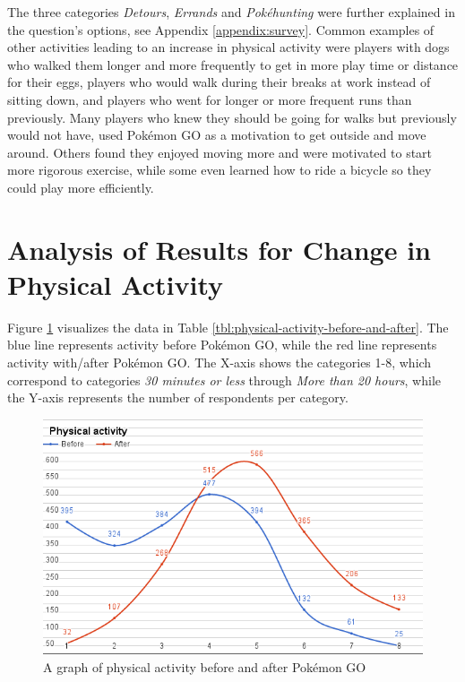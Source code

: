 The three categories \emph{Detours}, \emph{Errands} and \emph{Pokéhunting} were further explained in the question's options, see Appendix \ref{appendix:survey}. Common examples of other activities leading to an increase in physical activity were players with dogs who walked them longer and more frequently to get in more play time or distance for their eggs, players who would walk during their breaks at work instead of sitting down, and players who went for longer or more frequent runs than previously. Many players who knew they should be going for walks but previously would not have, used Pokémon GO as a motivation to get outside and move around. Others found they enjoyed moving more and were motivated to start more rigorous exercise, while some even learned how to ride a bicycle so they could play more efficiently.

\section{Analysis of Results for Change in Physical Activity}

Figure \ref{fig:physical-activity-graph} visualizes the data in Table \ref{tbl:physical-activity-before-and-after}. The blue line represents activity before Pokémon GO, while the red line represents activity with/after Pokémon GO. The X-axis shows the categories 1-8, which correspond to categories \emph{30 minutes or less} through \emph{More than 20 hours}, while the Y-axis represents the number of respondents per category.

\begin{figure}[h]
	\centering
	\includegraphics[width=\textwidth]{Figures/physical-activity-graph-2}
	\caption{A graph of physical activity before and after Pokémon GO}
	\label{fig:physical-activity-graph}
\end{figure}

